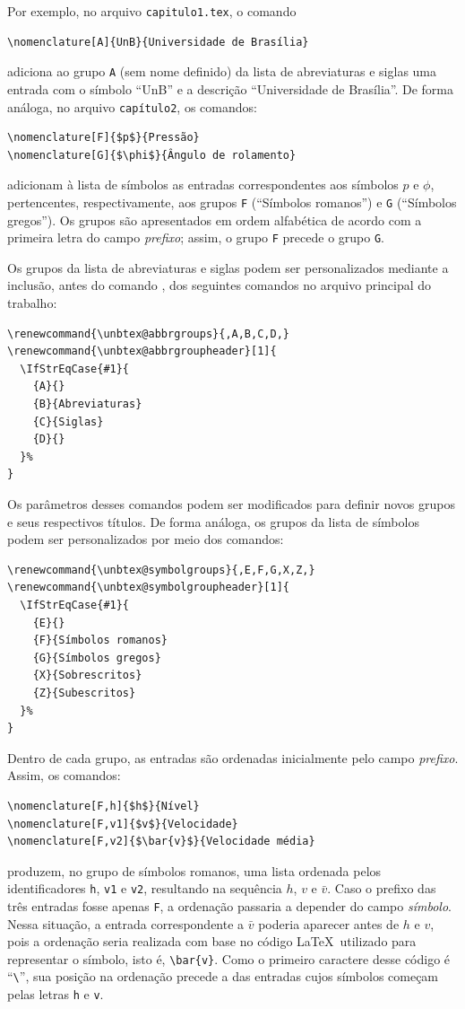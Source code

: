 Por exemplo, no arquivo \texttt{capitulo1.tex}, o comando
\begin{verbatim}
\nomenclature[A]{UnB}{Universidade de Brasília}
\end{verbatim}
adiciona ao grupo \texttt{A} (sem nome definido) da lista de abreviaturas e siglas uma entrada com o símbolo ``UnB'' e a descrição ``Universidade de Brasília''. De forma análoga, no arquivo \texttt{capítulo2}, os comandos:
\begin{verbatim}
\nomenclature[F]{$p$}{Pressão}
\nomenclature[G]{$\phi$}{Ângulo de rolamento}
\end{verbatim}
adicionam à lista de símbolos as entradas correspondentes aos símbolos $p$ e $\phi$, pertencentes, respectivamente, aos grupos \texttt{F} (``Símbolos romanos'') e \texttt{G} (``Símbolos gregos''). Os grupos são apresentados em ordem alfabética de acordo com a primeira letra do campo \emph{prefixo}; assim, o grupo \texttt{F} precede o grupo \texttt{G}.

Os grupos da lista de abreviaturas e siglas podem ser personalizados mediante a inclusão, antes do comando \verb||, dos seguintes comandos no arquivo principal do trabalho:
\begin{verbatim}
\renewcommand{\unbtex@abbrgroups}{,A,B,C,D,}
\renewcommand{\unbtex@abbrgroupheader}[1]{
  \IfStrEqCase{#1}{
    {A}{}
    {B}{Abreviaturas}
    {C}{Siglas}
    {D}{}
  }%
}
\end{verbatim}
Os parâmetros desses comandos podem ser modificados para definir novos grupos e seus respectivos títulos. De forma análoga, os grupos da lista de símbolos podem ser personalizados por meio dos comandos:
\begin{verbatim}
\renewcommand{\unbtex@symbolgroups}{,E,F,G,X,Z,}
\renewcommand{\unbtex@symbolgroupheader}[1]{
  \IfStrEqCase{#1}{
    {E}{}
    {F}{Símbolos romanos}
    {G}{Símbolos gregos}
    {X}{Sobrescritos}
    {Z}{Subescritos}
  }%
}
\end{verbatim}

Dentro de cada grupo, as entradas são ordenadas inicialmente pelo campo \emph{prefixo}. Assim, os comandos:
\begin{verbatim}
\nomenclature[F,h]{$h$}{Nível}
\nomenclature[F,v1]{$v$}{Velocidade}
\nomenclature[F,v2]{$\bar{v}$}{Velocidade média}
\end{verbatim}
produzem, no grupo de símbolos romanos, uma lista ordenada pelos identificadores \texttt{h}, \texttt{v1} e \texttt{v2}, resultando na sequência $h$, $v$ e $\bar{v}$. Caso o prefixo das três entradas fosse apenas \texttt{F}, a ordenação passaria a depender do campo \emph{símbolo}. Nessa situação, a entrada correspondente a $\bar{v}$ poderia aparecer antes de $h$ e $v$, pois a ordenação seria realizada com base no código \LaTeX\ utilizado para representar o símbolo, isto é, \verb|\bar{v}|. Como o primeiro caractere desse código é ``\verb|\|'', sua posição na ordenação precede a das entradas cujos símbolos começam pelas letras \texttt{h} e \texttt{v}.


